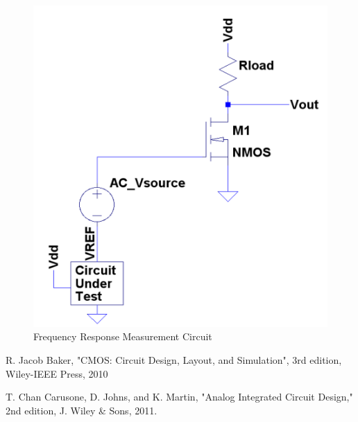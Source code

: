 \documentclass[conference]{IEEEtran}
\begin{document}
\begin{figure}[!htbp]
  	\centering
  	\includegraphics[scale=0.25]{images/fr-meas.png}
  	\caption[fr-meas]{Frequency Response Measurement Circuit}
  	\label{fig:fr-meas}
	\end{figure}



%
%
%
\newpage
\begin{thebibliography}{1}
R. Jacob Baker, "CMOS: Circuit Design, Layout, and Simulation", 3rd edition, Wiley-IEEE Press, 2010

T. Chan Carusone, D. Johns, and K. Martin, "Analog Integrated Circuit Design," 2nd edition, J. Wiley \& Sons, 2011.
\end{thebibliography}
\end{document}
